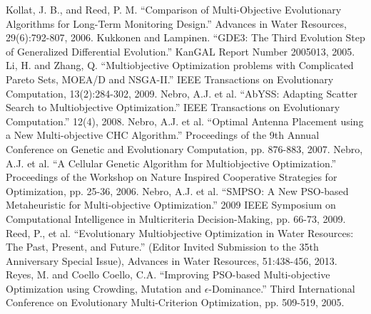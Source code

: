 \newline
\noindent
Kollat, J. B., and Reed, P. M. ``Comparison of Multi-Objective Evolutionary Algorithms for Long-Term Monitoring Design.''  Advances in Water Resources, 29(6):792-807, 2006.
\newline
\newline
\noindent
Kukkonen and Lampinen. ``GDE3: The Third Evolution Step of Generalized Differential Evolution.'' KanGAL Report Number 2005013, 2005. 
\newline
\newline
\noindent
Li, H. and Zhang, Q.  ``Multiobjective Optimization problems with Complicated Pareto Sets, MOEA/D and NSGA-II.''  IEEE Transactions on Evolutionary Computation, 13(2):284-302, 2009.
\newline
\newline
\noindent
Nebro, A.J. et al.  ``AbYSS: Adapting Scatter Search to Multiobjective Optimization.''  IEEE Transactions on Evolutionary Computation.''  12(4), 2008.
\newline
\newline
\noindent
Nebro, A.J. et al.  ``Optimal Antenna Placement using a New Multi-objective CHC Algorithm.''  Proceedings of the 9th Annual Conference on Genetic and Evolutionary Computation, pp. 876-883, 2007.
\newline
\newline
\noindent
Nebro, A.J. et al.  ``A Cellular Genetic Algorithm for Multiobjective Optimization.''  Proceedings of the Workshop on Nature Inspired Cooperative Strategies for Optimization, pp. 25-36, 2006.
\newline
\newline
\noindent
Nebro, A.J. et al.  ``SMPSO: A New PSO-based Metaheuristic for Multi-objective Optimization.''  2009 IEEE Symposium on Computational Intelligence in Multicriteria Decision-Making, pp. 66-73, 2009.
\newline
\newline
\noindent
Reed, P., et al.  ``Evolutionary Multiobjective Optimization in Water Resources: The Past, Present, and Future.'' (Editor Invited Submission to the 35th Anniversary Special Issue), Advances in Water Resources, 51:438-456, 2013.
\newline
\newline
\noindent
Reyes, M. and Coello Coello, C.A.  ``Improving PSO-based Multi-objective Optimization using Crowding, Mutation and $\epsilon$-Dominance.''  Third International Conference on Evolutionary Multi-Criterion Optimization, pp. 509-519, 2005.
